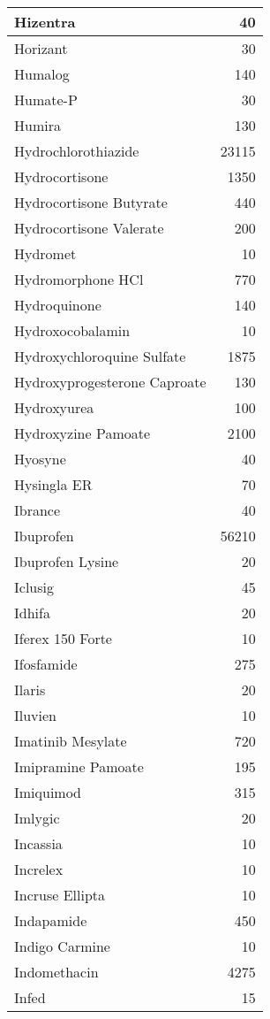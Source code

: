 \documentclass[
]{article}
\begin{document}
\begin{table}
\begin{tabular}[t]{l|r}
\hline
Hizentra & 40\\
\hline
Horizant & 30\\
\hline
Humalog & 140\\
\hline
Humate-P & 30\\
\hline
Humira & 130\\
\hline
Hydrochlorothiazide & 23115\\
\hline
Hydrocortisone & 1350\\
\hline
Hydrocortisone Butyrate & 440\\
\hline
Hydrocortisone Valerate & 200\\
\hline
Hydromet & 10\\
\hline
Hydromorphone HCl & 770\\
\hline
Hydroquinone & 140\\
\hline
Hydroxocobalamin & 10\\
\hline
Hydroxychloroquine Sulfate & 1875\\
\hline
Hydroxyprogesterone Caproate & 130\\
\hline
Hydroxyurea & 100\\
\hline
Hydroxyzine Pamoate & 2100\\
\hline
Hyosyne & 40\\
\hline
Hysingla ER & 70\\
\hline
Ibrance & 40\\
\hline
Ibuprofen & 56210\\
\hline
Ibuprofen Lysine & 20\\
\hline
Iclusig & 45\\
\hline
Idhifa & 20\\
\hline
Iferex 150 Forte & 10\\
\hline
Ifosfamide & 275\\
\hline
Ilaris & 20\\
\hline
Iluvien & 10\\
\hline
Imatinib Mesylate & 720\\
\hline
Imipramine Pamoate & 195\\
\hline
Imiquimod & 315\\
\hline
Imlygic & 20\\
\hline
Incassia & 10\\
\hline
Increlex & 10\\
\hline
Incruse Ellipta & 10\\
\hline
Indapamide & 450\\
\hline
Indigo Carmine & 10\\
\hline
Indomethacin & 4275\\
\hline
Infed & 15\\

\end{tabular}
\end{table}
\end{document}
